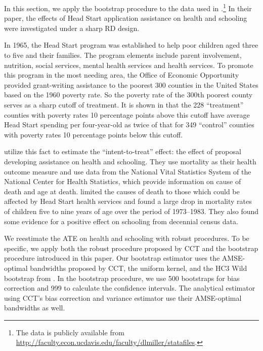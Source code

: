 \documentclass[12pt,fleqn]{article}
\begin{document}
In this section, we apply the bootstrap procedure to the data used in
\cite{ludwig2007}.\footnote{%
  The data is publicly available from
  \url{http://faculty.econ.ucdavis.edu/faculty/dlmiller/statafiles}.} %
In their paper, the effects of Head Start application assistance on health and
schooling were investigated under a sharp RD design.

In 1965, the Head Start program was established to help poor children aged three
to five and their families. The program elements include parent involvement,
nutrition, social services, mental health services and health services. To
promote this program in the most needing area, the Office of Economic
Opportunity provided grant-writing assistance to the poorest 300 counties in the
United States based on the 1960 poverty rate. So the poverty rate of the 300th
poorest county serves as a sharp cutoff of treatment. It is shown in
\cite{ludwig2007} that the 228 ``treatment'' counties with poverty rates 10
percentage points above this cutoff have average Head Start spending per
four-year-old as twice of that for 349 ``control'' counties with poverty rates
10 percentage points below this cutoff.

\cite{ludwig2007} utilize this fact to estimate the ``intent-to-treat'' effect:
the effect of proposal developing assistance on health and schooling. They use
mortality as their health outcome measure and use data from the National Vital
Statistics System of the National Center for Health Statistics, which provide
information on cause of death and age at death. \cite{ludwig2007} limited the
causes of death to those which could be affected by Head Start health services
and found a large drop in mortality rates of children five to nine years of age
over the period of 1973--1983. They also found some evidence for a positive
effect on schooling from decennial census data.

We reestimate the ATE on health and schooling with robust procedures. To be
specific, we apply both the robust procedure proposed by CCT and the bootstrap
procedure introduced in this paper.  Our bootstrap estimator uses the
AMSE-optimal bandwidths proposed by CCT, the uniform kernel, and the HC3 Wild
bootstrap from \citet{DF08}. In the bootstrap
procedure, we use 500 bootstraps for bias correction and 999 to calculate the
confidence intervals. The analytical estimator using CCT's bias correction and variance estimator use
their AMSE-optimal bandwidths as well.
\end{document}
